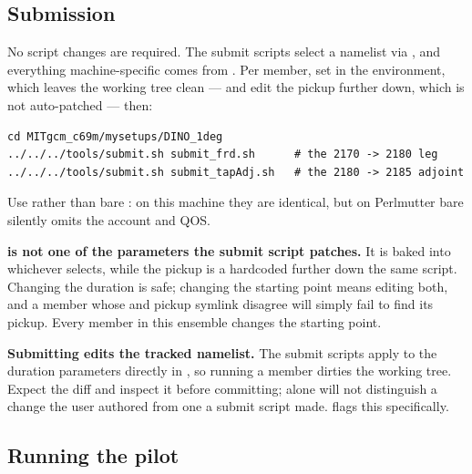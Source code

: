 \subsection{Submission}

No script changes are required. The submit scripts select a namelist via
, and everything machine-specific comes from
. Per member, set
 in the environment, which
leaves the working tree clean --- and edit the pickup  further
down, which is not auto-patched --- then:

\begin{footnotesize}
\begin{verbatim}
cd MITgcm_c69m/mysetups/DINO_1deg
../../../tools/submit.sh submit_frd.sh      # the 2170 -> 2180 leg
../../../tools/submit.sh submit_tapAdj.sh   # the 2180 -> 2185 adjoint
\end{verbatim}
\end{footnotesize}

Use  rather than bare : on this machine they
are identical, but on Perlmutter bare  silently omits the account
and QOS.

\begin{callout}
\textbf{ is not one of the parameters the submit script patches.}
It is baked into whichever   selects, while
the pickup is a hardcoded  further down the same script. Changing the
duration is safe; changing the starting point means editing both, and a member
whose  and pickup symlink disagree will simply fail to find its
pickup. Every member in this ensemble changes the starting point.
\end{callout}

\begin{callout}
\textbf{Submitting edits the tracked namelist.} The submit scripts apply
 to the duration parameters directly in
, so running a member dirties the working
tree. Expect the diff and inspect it before committing;  alone
will not distinguish a change the user authored from one a submit script made.
 flags this specifically.
\end{callout}

\subsection{Running the pilot}

